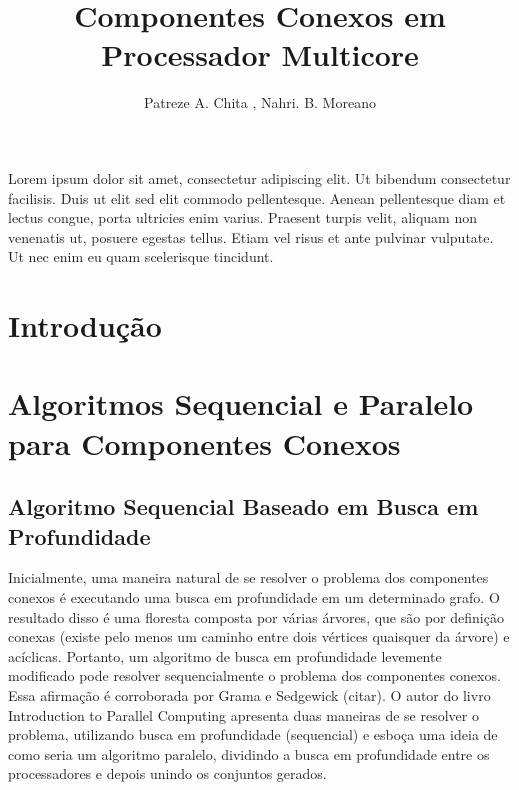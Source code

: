 \documentclass[12pt]{article}
\title{Componentes Conexos em Processador Multicore}
\author{Patreze A. Chita \inst{1}, Nahri. B. Moreano\inst{1}}
\begin{document}
 

\maketitle

     
\begin{resumo} 
Lorem ipsum dolor sit amet, consectetur adipiscing elit. Ut bibendum consectetur facilisis. Duis ut elit sed elit commodo pellentesque. Aenean pellentesque diam et lectus congue, porta ultricies enim varius. Praesent turpis velit, aliquam non venenatis ut, posuere egestas tellus. Etiam vel risus et ante pulvinar vulputate. Ut nec enim eu quam scelerisque tincidunt.
\end{resumo}

\section{Introdução}
{\color{gray}\lipsum[1]}

\section{Algoritmos Sequencial e Paralelo para Componentes Conexos}


\subsection{Algoritmo Sequencial Baseado em Busca em Profundidade}

Inicialmente, uma maneira natural de se resolver o problema dos componentes conexos é executando uma busca em profundidade em um determinado grafo. O resultado disso é uma floresta composta por várias árvores, que são por definição conexas (existe pelo menos um caminho entre dois vértices quaisquer da árvore) e acíclicas. Portanto, um algoritmo de busca em profundidade levemente modificado pode resolver sequencialmente o problema dos componentes conexos. Essa afirmação é corroborada por Grama e Sedgewick (citar). O autor do livro Introduction to Parallel Computing apresenta duas maneiras de se resolver o problema, utilizando busca em profundidade (sequencial) e esboça uma ideia de como seria um algoritmo paralelo, dividindo a busca em profundidade entre os processadores e depois unindo os conjuntos gerados.
\end{document}
